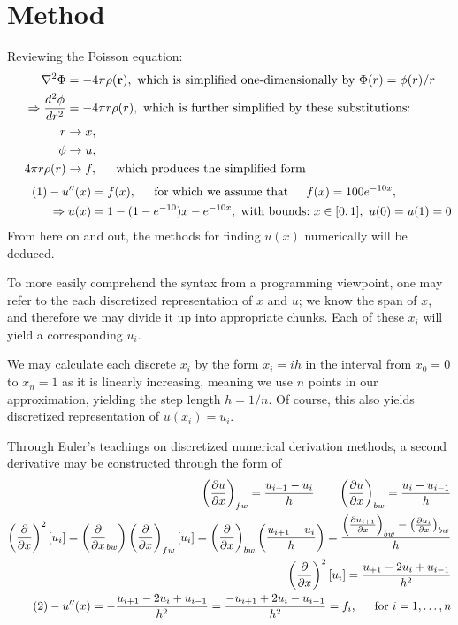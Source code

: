 \documentclass[11pt,a4paper,notitlepage]{article}
\newcommand\pd[2]{\frac{\partial #1}{\partial #2}}
\begin{document}
\section{Method}
Reviewing the Poisson equation:
\begin{align*}
\nabla ^2 \Phi &= -4\pi\rho(\mathbf{r}), \ \text{which is simplified one-dimensionally by} \ \Phi(r) = \phi(r)/r \\
\Rightarrow \frac{d^2 \phi}{dr^2} &= -4\pi r \rho(r), \ \text{which is further simplified by these substitutions:}\\
r &\rightarrow x, \\
\phi &\rightarrow u,\\
4\pi r\rho(r) &\rightarrow f, \indent \text{which produces the simplified form}
\end{align*}\begin{align*}\label{eq:1}\tag{1}
-u''(x) &= f(x), \indent \text{for which we assume that} \indent f(x) = 100e^{-10x}, \\
\Rightarrow u(x) &= 1- (1-e^{-10})x - e^{-10x},\ \text{with bounds:}\ x \in [0,1],\ u(0) = u(1)= 0
\end{align*}
From here on and out, the methods for finding $u(x)$ numerically will be deduced.

To more easily comprehend the syntax from a programming viewpoint, one may refer to the each discretized representation of $x$ and $u$; we know the span of $x$, and therefore we may divide it up into appropriate chunks. Each of these $x_i$ will yield a corresponding $u_i$.

We may calculate each discrete $x_i$ by the form $x_i = ih$ in the interval from $x_0 = 0$ to $x_{n} = 1$ as it is linearly increasing, meaning we use $n$ points in our approximation, yielding the step length $h = 1/n$. Of course, this also yields discretized representation of $u(x_i) = u_i$.

Through Euler's teachings on discretized numerical derivation methods, a second derivative may be constructed through the form of
\begin{align}
\nonumber
\left(\pd{u}{x}\right)_{fw} = \frac{u_{i+1} - u_i}{h} \quad\quad
\left(\pd{u}{x}\right)_{bw} = \frac{u_{i} - u_{i-1}}{h} \\
\nonumber
\left(\pd{}{x}\right)^2[u_i] = \left(\pd{}{x}_{bw}\right)\left(\pd{}{x}\right)_{fw}[u_i] = \left(\pd{}{x}\right)_{bw}\left(\frac{u_{i+1} - u_i}{h}\right) =\frac{\left(\pd{u_{i+1}}{x}\right)_{bw} - \left(\pd{u_i}{x}\right)_{bw}}{h} \\
\nonumber
\left(\pd{}{x}\right)^2[u_i] = \frac{u_{+1} - 2u_i + u_{i-1}}{h^2}\\
\label{eq:2} \tag{2}
-u''(x) = - \frac{u_{i+1} - 2u_i + u_{i-1}}{h^2} = \frac{- u_{i+1} + 2u_i - u_{i-1}}{h^2} = f_i , \indent \text{for}\ i = 1, \hdots, n
\end{align}
\end{document}

